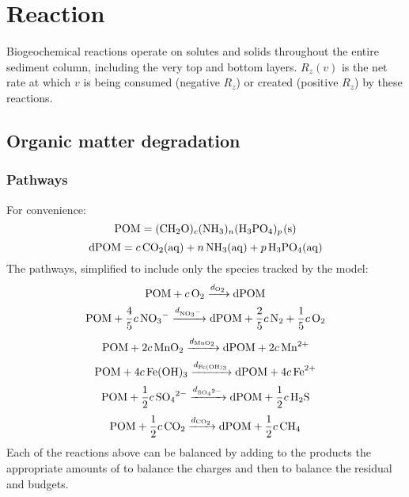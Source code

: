 \documentclass[a4paper]{article}
\begin{document}
\section{Reaction}\label{sx:reaction}

Biogeochemical reactions operate on solutes and solids throughout the entire sediment column, including the very top and bottom layers.  $R_z(v)$ is the net rate at which $v$ is being consumed (negative $R_z$) or created (positive $R_z$) by these reactions.


\subsection{Organic matter degradation}

\subsubsection{Pathways}

For convenience:
\begin{equation}
  \ce{POM} = \ce{(CH2O)$_c$(NH3)$_n$(H3PO4)$_p$(s)}
\end{equation}
\begin{equation}
  \ce{dPOM} = \ce{$c$CO2(aq) + $n$NH3(aq) + $p$H3PO4(aq)}
\end{equation}
The pathways, simplified to include only the species tracked by the model:
\begin{equation}
  \ce{POM + $c$O2 ->[$d_{\ce{O2}}$] dPOM}%
\end{equation}
\begin{equation}
  \ce{POM + $\frac{4}{5}c\,$NO3- ->[$d_{\ce{NO3-}}$] dPOM + $\frac{2}{5}c\,$N2 + $\frac{1}{5}c\,$O2}%
\end{equation}
\begin{equation}
  \ce{POM + $2c\,$MnO2 ->[$d_{\ce{MnO2}}$] dPOM + $2c\,$Mn^2+}%
\end{equation}
\begin{equation}
  \ce{POM + $4c\,$Fe(OH)3 ->[$d_{\ce{Fe(OH)3}}$] dPOM + $4c\,$Fe^2+}%
\end{equation}
\begin{equation}
  \ce{POM + $\frac{1}{2}c\,$SO4^2- ->[$d_{\ce{SO4^2-}}$] dPOM + $\frac{1}{2}c\,$H2S}%
\end{equation}
\begin{equation}
  \ce{POM + $\frac{1}{2}c\,$CO2 ->[$d_{\ce{CO2}}$] dPOM + $\frac{1}{2}c\,$CH4}
\end{equation}
Each of the reactions above can be balanced by adding to the products the appropriate amounts of  to balance the charges and then  to balance the residual  and  budgets.
\end{document}
